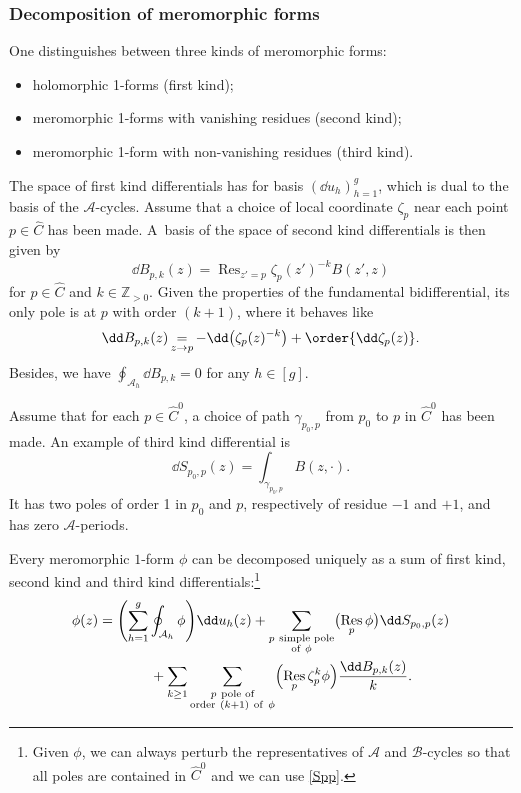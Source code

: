 \documentclass[10pt,a4paper]{amsart}
\numberwithin{equation}{section}
\newcommand{\A}{\mathcal{A}}
\newcommand{\B}{\mathcal{B}}
\begin{document}
\subsubsection{Decomposition of meromorphic forms}
\label{sec:decomp-merom-forms}

One distinguishes between three kinds of meromorphic forms:
\begin{itemize}\itemsep=0pt
 \item holomorphic 1-forms (first kind);
 \item meromorphic 1-forms with vanishing residues (second kind);
 \item meromorphic 1-form with non-vanishing residues (third kind).
\end{itemize}

The space of first kind differentials has for basis $(\dd u_{h})_{h = 1}^{g}$, which is dual to the basis of the $\A$-cycles.
Assume that a choice of local coordinate $\zeta_p$ near each point $p \in \widehat{C}$ has been made. A~basis of the space of second kind differentials is then given by
\begin{equation*}
 \dd B_{p,k}(z) = \mathop{\mathrm{Res}}_{z' = p}\zeta_{p}(z')^{-k}B(z', z)
\end{equation*}
for $p \in \widehat{C}$ and $k \in \mathbb{Z}_{> 0}$. Given the properties of the fundamental bidifferential, its only pole is at $p$ with order $(k + 1)$, where it behaves like
\[
\dd B_{p,k}(z) \mathop{=}_{z \rightarrow p} -\dd\bigl(\zeta_{p}(z)^{-k}\bigr) + \order{\dd \zeta_p(z)}.
\]
Besides, we have $\oint_{\A_h} \dd B_{p,k} = 0$ for any $h \in [g]$.

Assume that for each $p \in \widehat{C}^0$, a choice of path $\gamma_{p_0,p}$ from $p_0$ to $p$ in $\widehat{C}^0$ has been made. An example of third kind differential is
\begin{equation}
 \label{Spp} \dd S_{p_0,p}(z) = \int_{\gamma_{p_0,p}} B(z, \cdot).
\end{equation}
It has two poles of order 1 in $p_0$ and $p$, respectively of residue $-1$ and $+1$, and has zero $\A$-periods.

Every meromorphic $1$-form $\phi$ can be decomposed uniquely as a sum of first kind, second kind and third kind differentials:\footnote{Given $\phi$, we can always perturb the representatives of $\A$ and $\B$-cycles so that all poles are contained in $\widehat{C}^0$ and we can use \eqref{Spp}.}
\begin{gather*}
\phi(z) = \Biggl(\sum_{h = 1}^{g} \oint_{\A_h} \phi\Biggr) \dd u_h(z) + \sum_{\substack{p\ \text{simple pole} \\ \text{of}\ \phi}} \bigl(\mathop{\text{Res}}_{p} \phi\bigr) \dd S_{p_0,p}(z) \\
\hphantom{\phi(z) =}{}
 + \sum_{k \geq 1} \sum_{\substack{p\ \text{pole of} \\ \text{order}\ (k + 1)\ {\rm of}\ \phi}} \Bigl(\mathop{\mathrm{Res}}_{p} \zeta_p^{k} \phi \Bigr)\frac{\dd B_{p,k}(z)}{k}.
\end{gather*}
\end{document}
